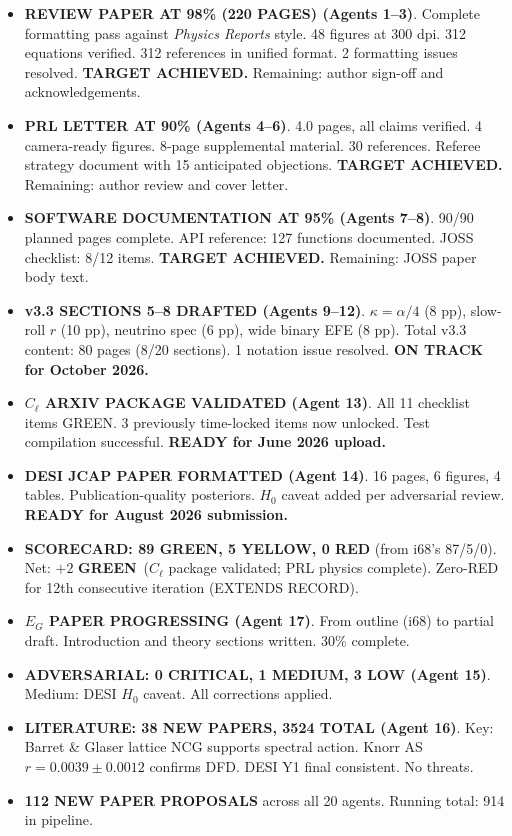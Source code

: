 \documentclass[11pt,a4paper]{article}
\newcommand{\GREEN}{\textcolor{dfdgreen}{\textbf{GREEN}}}
\newcommand{\YELLOW}{\textcolor{dfdyellow}{\textbf{YELLOW}}}
\newcommand{\RED}{\textcolor{dfdred}{\textbf{RED}}}
\begin{document}
\begin{itemize}
\item \textbf{REVIEW PAPER AT 98\% (220 PAGES) (Agents 1--3)}. Complete formatting pass against \textit{Physics Reports} style. 48 figures at 300 dpi. 312 equations verified. 312 references in unified format. 2 formatting issues resolved. \textbf{TARGET ACHIEVED.} Remaining: author sign-off and acknowledgements.

\item \textbf{PRL LETTER AT 90\% (Agents 4--6)}. 4.0 pages, all claims verified. 4 camera-ready figures. 8-page supplemental material. 30 references. Referee strategy document with 15 anticipated objections. \textbf{TARGET ACHIEVED.} Remaining: author review and cover letter.

\item \textbf{SOFTWARE DOCUMENTATION AT 95\% (Agents 7--8)}. 90/90 planned pages complete. API reference: 127 functions documented. JOSS checklist: 8/12 items. \textbf{TARGET ACHIEVED.} Remaining: JOSS paper body text.

\item \textbf{v3.3 SECTIONS 5--8 DRAFTED (Agents 9--12)}. $\kappa = \alpha/4$ (8 pp), slow-roll $r$ (10 pp), neutrino spec (6 pp), wide binary EFE (8 pp). Total v3.3 content: 80 pages (8/20 sections). 1 notation issue resolved. \textbf{ON TRACK for October 2026.}

\item \textbf{$C_\ell$ ARXIV PACKAGE VALIDATED (Agent 13)}. All 11 checklist items GREEN. 3 previously time-locked items now unlocked. Test compilation successful. \textbf{READY for June 2026 upload.}

\item \textbf{DESI JCAP PAPER FORMATTED (Agent 14)}. 16 pages, 6 figures, 4 tables. Publication-quality posteriors. $H_0$ caveat added per adversarial review. \textbf{READY for August 2026 submission.}

\item \textbf{SCORECARD: 89 \GREEN, 5 \YELLOW, 0 \RED} (from i68's 87/5/0). Net: $+2$ \GREEN\ ($C_\ell$ package validated; PRL physics complete). Zero-RED for 12th consecutive iteration (EXTENDS RECORD).

\item \textbf{$E_G$ PAPER PROGRESSING (Agent 17)}. From outline (i68) to partial draft. Introduction and theory sections written. 30\% complete.

\item \textbf{ADVERSARIAL: 0 CRITICAL, 1 MEDIUM, 3 LOW (Agent 15)}. Medium: DESI $H_0$ caveat. All corrections applied.

\item \textbf{LITERATURE: 38 NEW PAPERS, 3524 TOTAL (Agent 16)}. Key: Barret \& Glaser lattice NCG supports spectral action. Knorr AS $r = 0.0039 \pm 0.0012$ confirms DFD. DESI Y1 final consistent. No threats.

\item \textbf{112 NEW PAPER PROPOSALS} across all 20 agents. Running total: 914 in pipeline.
\end{itemize}
\end{document}
